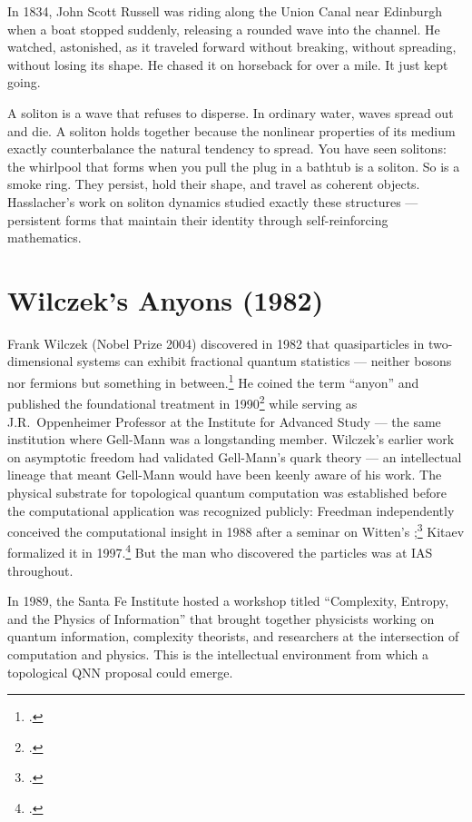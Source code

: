 In 1834, John Scott Russell was riding along the Union Canal near Edinburgh when a boat stopped suddenly, releasing a rounded wave into the channel. He watched, astonished, as it traveled forward without breaking, without spreading, without losing its shape. He chased it on horseback for over a mile. It just kept going.

A \gls{soliton} is a wave that refuses to disperse. In ordinary water, waves spread out and die. A soliton holds together because the nonlinear properties of its medium exactly counterbalance the natural tendency to spread. You have seen solitons: the whirlpool that forms when you pull the plug in a bathtub is a soliton. So is a smoke ring. They persist, hold their shape, and travel as coherent objects. Hasslacher's work on soliton dynamics studied exactly these structures --- persistent forms that maintain their identity through self-reinforcing mathematics.

\section*{Wilczek's Anyons (1982)}
\label{pos10:wilczeks-anyons-1982}

Frank Wilczek (Nobel Prize 2004) discovered in 1982 that quasiparticles in two-dimensional systems can exhibit fractional quantum statistics --- neither bosons nor fermions but something in between.\footcite{wilczek1982} He coined the term ``anyon'' and published the foundational treatment in 1990\footcite{wilczek1990} while serving as J.R.\ Oppenheimer Professor at the Institute for Advanced Study --- the same institution where Gell-Mann was a longstanding member. Wilczek's earlier work on asymptotic freedom had validated Gell-Mann's quark theory --- an intellectual lineage that meant Gell-Mann would have been keenly aware of his work. The physical substrate for topological quantum computation was established before the computational application was recognized publicly: Freedman independently conceived the computational insight in 1988 after a seminar on Witten's ;\footcite{freedman1998} Kitaev formalized it in 1997.\footcite{kitaev2003} But the man who discovered the particles was at IAS throughout.

In 1989, the Santa Fe Institute hosted a workshop titled ``Complexity, Entropy, and the Physics of Information'' that brought together physicists working on quantum information, complexity theorists, and researchers at the intersection of computation and physics. This is the intellectual environment from which a topological QNN proposal could emerge.

